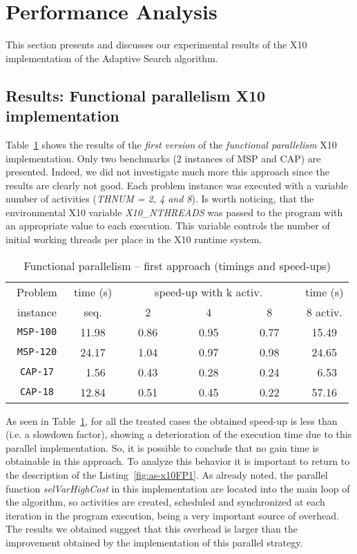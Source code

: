 \documentclass{llncs}
\begin{document}
\section{Performance Analysis}
\label{sec:PerformanceAnalysis}
This section presents and discusses our experimental results of the
X10 implementation of the Adaptive Search algorithm.

\subsection{Results: Functional parallelism X10 implementation}
Table~\ref{tab:FP1Result} shows the results of the \emph{first
  version} of the \emph{functional parallelism} X10
implementation. Only two benchmarks (2 instances of MSP and CAP) are
presented. Indeed, we did not investigate much more this approach
since the results are clearly not good.  Each problem instance was
executed with a variable number of activities (\textit{THNUM = 2, 4
  and 8}). Is worth noticing, that the environmental X10 variable
\emph{X10\_NTHREADS} was passed to the program with an appropriate
value to each execution. This variable controls the number of initial
working threads per place in the X10 runtime system.

\begin{table}[htb]
  \begin{center}
  \begin{tabular}{||c|c|c|c|c|c||}
    \hline
    ~Problem~ & time (s) & \multicolumn{3}{|c|}{speed-up with k activ.} & time (s) \\
    \cline{3-5}
    instance  & seq.     & ~~~~2~~~~ & ~~~~4~~~~ & ~~~~8~~~~            & 8 activ.\\
    \hline
    \hline
    \texttt{MSP-100} & 11.98 & 0.86 & 0.95 & 0.77 & 15.49 \\
    \texttt{MSP-120} & 24.17 & 1.04 & 0.97 & 0.98 & 24.65 \\
    \hline
    \texttt{CAP-17}  & ~1.56 & 0.43 & 0.28 & 0.24 & ~6.53 \\
    \texttt{CAP-18}  & 12.84 & 0.51 & 0.45 & 0.22 & 57.16 \\
    \hline
  \end{tabular}
  \end{center}
  \caption{Functional parallelism -- first approach (timings and speed-ups)}
  \label{tab:FP1Result}
\end{table}

As seen in Table~\ref{tab:FP1Result}, for all the treated cases the
obtained speed-up is less than  (i.e. a slowdown factor), showing a
deterioration of the execution time due to this parallel
implementation. So, it is possible to conclude that no gain time is
obtainable in this approach. To analyze this behavior it is important
to return to the description of the Listing~\ref{fig:as-x10FP1}.  As
already noted, the parallel function \emph{selVarHighCost} in this
implementation are located into the main loop of the algorithm, so
 activities are created, scheduled and synchronized at each
iteration in the program execution, being a very important source of
overhead.  The results we obtained suggest that this overhead is
larger than the improvement obtained by the implementation of this
parallel strategy.
\end{document}
